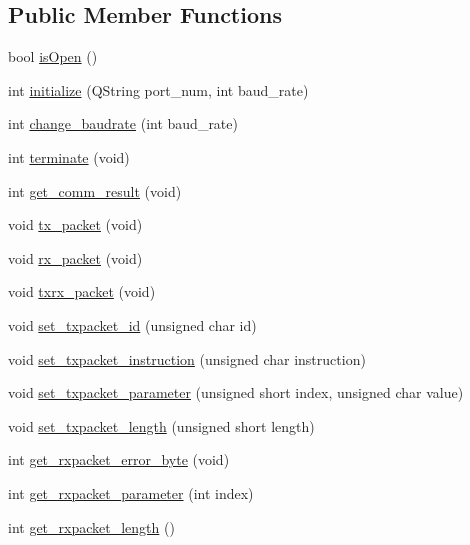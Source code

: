 \subsection*{Public Member Functions}
\begin{DoxyCompactItemize}
\item 
bool \hyperlink{classdynamixel2_a3a93b1220d71166f282ef5f2d8307dbe}{is\+Open} ()
\item 
int \hyperlink{classdynamixel2_aa2c59aef6a9f1adf7df3bf43c8b255a2}{initialize} (Q\+String port\+\_\+num, int baud\+\_\+rate)
\item 
int \hyperlink{classdynamixel2_ad0cef34ebfdd57ba0110e7c3623d7aa6}{change\+\_\+baudrate} (int baud\+\_\+rate)
\item 
int \hyperlink{classdynamixel2_a84d998585aab4e92413220ca5b489a0a}{terminate} (void)
\item 
int \hyperlink{classdynamixel2_a46f02d077a26dae6e8e52df6d89f035a}{get\+\_\+comm\+\_\+result} (void)
\item 
void \hyperlink{classdynamixel2_a526e395e15fbf50ffbc8ce0853b08233}{tx\+\_\+packet} (void)
\item 
void \hyperlink{classdynamixel2_a7ca03821f030981263c55f2ae2786c4c}{rx\+\_\+packet} (void)
\item 
void \hyperlink{classdynamixel2_a2cccd455a52afe99a37b249aa834cdc7}{txrx\+\_\+packet} (void)
\item 
void \hyperlink{classdynamixel2_a78e147772e166a87d8e64656843d9e37}{set\+\_\+txpacket\+\_\+id} (unsigned char id)
\item 
void \hyperlink{classdynamixel2_a86ac906e5b548649510366ca978aed05}{set\+\_\+txpacket\+\_\+instruction} (unsigned char instruction)
\item 
void \hyperlink{classdynamixel2_a4737bc55c853cedb5102d5c38ab1a1b5}{set\+\_\+txpacket\+\_\+parameter} (unsigned short index, unsigned char value)
\item 
void \hyperlink{classdynamixel2_a2831a22a03d36e4590c9ad368efa10cf}{set\+\_\+txpacket\+\_\+length} (unsigned short length)
\item 
int \hyperlink{classdynamixel2_a0de7ef4de89f220945b9b9028c24796f}{get\+\_\+rxpacket\+\_\+error\+\_\+byte} (void)
\item 
int \hyperlink{classdynamixel2_a16298831a1f2430bc9d7fc826d8c5dfd}{get\+\_\+rxpacket\+\_\+parameter} (int index)
\item 
int \hyperlink{classdynamixel2_a70ada371be989aacab473e81cc002156}{get\+\_\+rxpacket\+\_\+length} ()
\item 

\end{DoxyCompactItemize}
